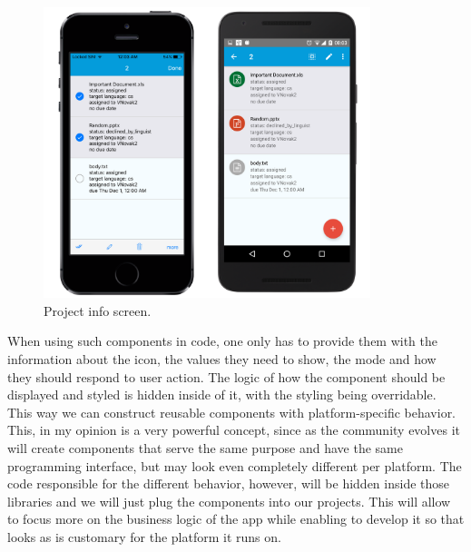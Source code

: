 \begin{figure}[]
	\includegraphics[width=0.85\textwidth]{pics/screenshots/projs}
	\caption{Project info screen.}
	\label{projInfo}
\end{figure}


When using such components in code, one only has to provide them with the information about the icon, the values they need to show, the mode and how they should respond to user action. The logic of how the component should be displayed and styled is hidden inside of it, with the styling being overridable. This way we can construct reusable components with platform-specific behavior. This, in my opinion is a very powerful concept, since as the community evolves it will create components that serve the same purpose and have the same programming interface, but may look even completely different per platform. The code responsible for the different behavior, however, will be hidden inside those libraries and we will just plug the components into our projects. This will allow to focus more on the business logic of the app while enabling to develop it so that looks as is customary for the platform it runs on.

